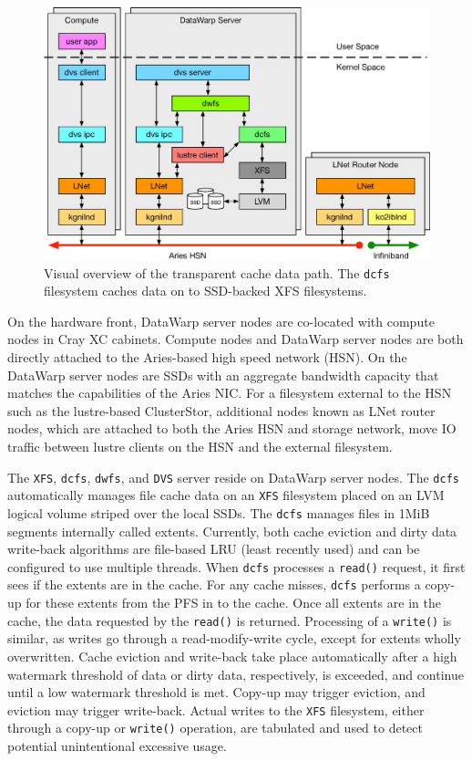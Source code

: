 \documentclass[10pt, conference, compsocconf]{IEEEtran}
\begin{document}
\begin{figure}
\centering
\includegraphics[width=\textwidth]{graphics/tcdp}
\caption{Visual overview of the transparent cache data path.  The \texttt{dcfs} filesystem caches data on to SSD-backed XFS filesystems.\label{tcdp}}
\end{figure}

On the hardware front, DataWarp server nodes are co-located with compute nodes in Cray XC cabinets.  Compute nodes and DataWarp server nodes are both directly attached to the Aries-based high speed network (HSN).  On the DataWarp server nodes are SSDs with an aggregate bandwidth capacity that matches the capabilities of the Aries NIC.  For a filesystem external to the HSN such as the lustre-based ClusterStor, additional nodes known as LNet router nodes, which are attached to both the Aries HSN and storage network, move IO traffic between lustre clients on the HSN and the external filesystem.

The \texttt{XFS}, \texttt{dcfs}, \texttt{dwfs}, and \texttt{DVS} server reside on DataWarp server nodes.  The \texttt{dcfs} automatically manages file cache data on an \texttt{XFS} filesystem placed on an LVM logical volume striped over the local SSDs.  The \texttt{dcfs} manages files in 1MiB segments internally called extents.  Currently, both cache eviction and dirty data write-back algorithms are file-based LRU (least recently used) and can be configured to use multiple threads.  When \texttt{dcfs} processes a \texttt{read()} request, it first sees if the extents are in the cache.  For any cache misses, \texttt{dcfs} performs a copy-up for these extents from the PFS in to the cache.  Once all extents are in the cache, the data requested by the \texttt{read()} is returned.  Processing of a \texttt{write()} is similar, as writes go through a read-modify-write cycle, except for extents wholly overwritten.  Cache eviction and write-back take place automatically after a high watermark threshold of data or dirty data, respectively, is exceeded, and continue until a low watermark threshold is met.  Copy-up may trigger eviction, and eviction may trigger write-back.  Actual writes to the \texttt{XFS} filesystem, either through a copy-up or \texttt{write()} operation, are tabulated and used to detect potential unintentional excessive usage.
\end{document}
